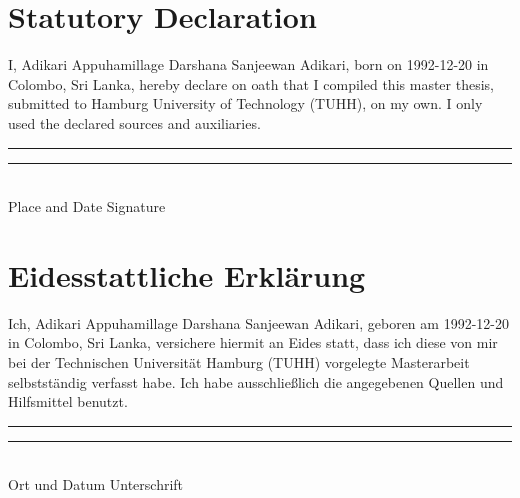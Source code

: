 \chapter*{Statutory Declaration}

\noindent
I, Adikari Appuhamillage Darshana Sanjeewan Adikari, born on 1992-12-20 in Colombo, Sri Lanka, hereby declare on oath that I compiled this master thesis, submitted to Hamburg University of Technology (TUHH), on my own. I only used the declared sources and auxiliaries.

\vspace*{5em}

\noindent
{\rule{15em}{.5pt}}\hfill{\rule{15em}{.5pt}}\\
Place and Date \hfill Signature

\begingroup
\renewcommand{\cleardoublepage}{}
\renewcommand{\clearpage}{}
\chapter*{Eidesstattliche Erklärung}
\endgroup

\noindent
Ich, Adikari Appuhamillage Darshana Sanjeewan Adikari, geboren am 1992-12-20 in Colombo, Sri Lanka, versichere hiermit an Eides statt,
dass ich diese von mir bei der Technischen Universität Hamburg (TUHH) vorgelegte
Masterarbeit selbstständig verfasst habe. Ich habe ausschließlich
die angegebenen Quellen und Hilfsmittel benutzt.

\vspace*{5em}

\noindent
{\rule{15em}{.5pt}}\hfill{\rule{15em}{.5pt}}\\
Ort und Datum \hfill Unterschrift
